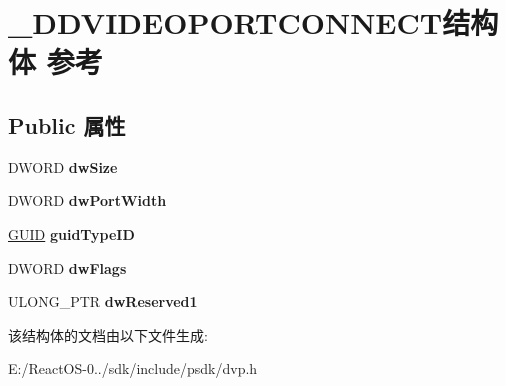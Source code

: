 \hypertarget{struct___d_d_v_i_d_e_o_p_o_r_t_c_o_n_n_e_c_t}{}\section{\+\_\+\+D\+D\+V\+I\+D\+E\+O\+P\+O\+R\+T\+C\+O\+N\+N\+E\+C\+T结构体 参考}
\label{struct___d_d_v_i_d_e_o_p_o_r_t_c_o_n_n_e_c_t}
\subsection*{Public 属性}
\begin{DoxyCompactItemize}
\item 
\mbox{\label{struct___d_d_v_i_d_e_o_p_o_r_t_c_o_n_n_e_c_t_aa971e4d7fb8cb2fea4aeb6504da13e77}} 
D\+W\+O\+RD {\bfseries dw\+Size}
\item 
\mbox{\label{struct___d_d_v_i_d_e_o_p_o_r_t_c_o_n_n_e_c_t_ad4cb62df3693142f236bf69742b2b8d3}} 
D\+W\+O\+RD {\bfseries dw\+Port\+Width}
\item 
\mbox{\label{struct___d_d_v_i_d_e_o_p_o_r_t_c_o_n_n_e_c_t_aac0f8ec595f52384aaadca7b7a676fbb}} 
\hyperlink{interface_g_u_i_d}{G\+U\+ID} {\bfseries guid\+Type\+ID}
\item 
\mbox{\label{struct___d_d_v_i_d_e_o_p_o_r_t_c_o_n_n_e_c_t_a1d83c421a5d928155295696e8b9d846c}} 
D\+W\+O\+RD {\bfseries dw\+Flags}
\item 
\mbox{\label{struct___d_d_v_i_d_e_o_p_o_r_t_c_o_n_n_e_c_t_a7ba957276be10a8994481abcecc00bcd}} 
U\+L\+O\+N\+G\+\_\+\+P\+TR {\bfseries dw\+Reserved1}
\end{DoxyCompactItemize}


该结构体的文档由以下文件生成\+:\begin{DoxyCompactItemize}
\item 
E\+:/\+React\+O\+S-\/0../sdk/include/psdk/dvp.\+h\end{DoxyCompactItemize}
